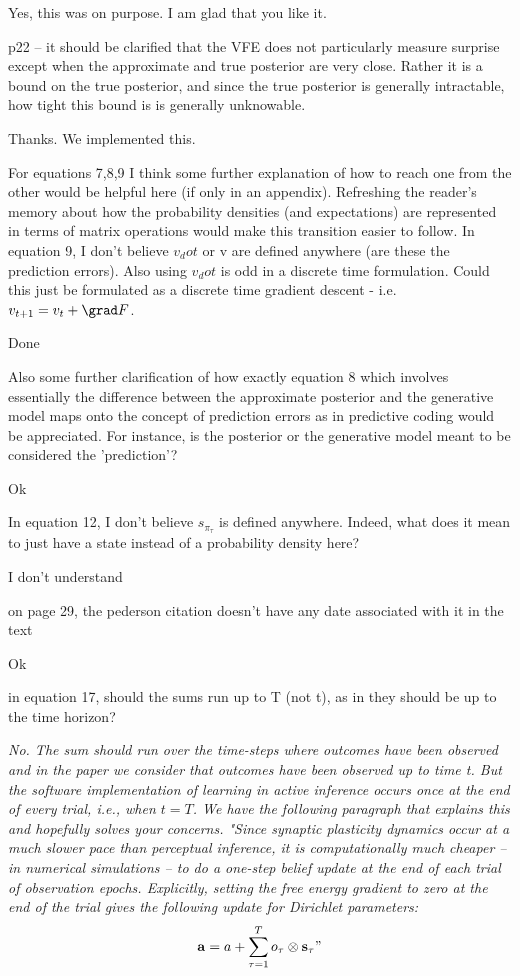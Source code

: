 \documentclass{article}
\begin{document}
Yes, this was on purpose. I am glad that you like it.

p22 -- it should be clarified that the VFE does not particularly measure surprise except when the approximate and true posterior are very close. Rather it is a bound on the true posterior, and since the true posterior is generally intractable, how tight this bound is is generally unknowable.

Thanks. We implemented this.

For equations 7,8,9 I think some further explanation of how to reach one from the other would be helpful here (if only in an appendix). Refreshing the reader's memory about how the probability densities (and expectations) are represented in terms of matrix operations would make this transition easier to follow. In equation 9, I don't believe $v_dot$ or v are defined anywhere (are these the prediction errors). Also using $v_dot$ is odd in a discrete time formulation. Could this just be formulated as a discrete time gradient descent - i.e. $v_{t+1} = v_t + \grad F$.

Done

Also some further clarification of how exactly equation 8 which involves essentially the difference between the approximate posterior and the generative model maps onto the concept of prediction errors as in predictive coding would be appreciated. For instance, is the posterior or the generative model meant to be considered the 'prediction'?

Ok

In equation 12, I don't believe $s_\pi_\tau$ is defined anywhere. Indeed, what does it mean to just have a state instead of a probability density here?

I don’t understand

on page 29, the pederson citation doesn't have any date associated with it in the text

Ok

in equation 17, should the sums run up to T (not t), as in they should be up to the time horizon?

\textit{No. The sum should run over the time-steps where outcomes have been observed and in the paper we consider that outcomes have been observed up to time t. But the software implementation of learning in active inference occurs once at the end of every trial, i.e., when $t=T$. We have the following paragraph that explains this and hopefully solves your concerns. "Since synaptic plasticity dynamics occur at a much slower pace than perceptual inference, it is computationally much cheaper -- in numerical simulations -- to do a one-step belief update at the end of each trial of observation epochs. Explicitly, setting the free energy gradient to zero at the end of the trial gives the following update for Dirichlet parameters:}
	\begin{equation}
	\label{eq: learning dirichlet one step}
  	    \bold a=  a +\sum_{\tau =1}^T o_\tau \otimes \bold s_\tau"
  	\end{equation}
\end{document}
